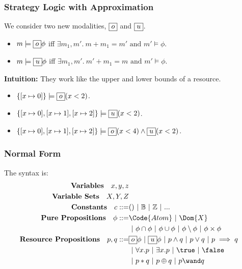 \begin{frame}[fragile]
    \frametitle{Strategy Logic with Approximation}

\begin{definition} We consider two new modalities, $\boxed{o}$ and $\boxed{u}$.
    \begin{itemize}
        \item $m \models\boxed{o}\phi$ iff $\exists m_1, m'.\ m + m_1 = m' \text{ and } m' \models\phi$.
        \item $m \models\boxed{u}\phi$ iff $\exists m_1, m'.\ m' + m_1 = m  \text{ and } m' \models\phi$.
    \end{itemize}
\end{definition}

\textbf{Intuition:} They work like the upper and lower bounds of a resource.

\begin{example}
    \begin{itemize}
        \item $\{[x\mapsto 0]\} \models\boxed{o}(x < 2)$.
        \item $\{[x\mapsto 0], [x\mapsto 1], [x\mapsto 2]\} \models\boxed{u}(x < 2)$.
        \item $\{[x\mapsto 0], [x\mapsto 1], [x\mapsto 2]\} \models\boxed{o}(x < 4) \land \boxed{u}(x < 2)$.
    \end{itemize}
\end{example}

\end{frame}

\begin{frame}[fragile]
    \frametitle{Normal Form}

\begin{definition} The syntax is:
\begin{align*}
    \textbf{Variables} \quad x, y, z  \\
    \textbf{Variable Sets} \quad X, Y, Z \\
    \textbf{Constants} \quad c ::= & () ~|~ \mathbb{B} ~|~ \mathbb{Z} ~|~ ...  \\
    \textbf{Pure Propositions} \quad \phi ::= & \Code{Atom} ~|~ \Dom{X}\\
    & ~|~ \phi \cap \phi ~|~ \phi \cup \phi ~|~ \phi \setminus \phi ~|~ \phi \times \phi \\
    \textbf{Resource Propositions} \quad p,q ::= & \subExt \phi ~|~ \supExt \phi ~|~ p \land q ~|~ p \lor q ~|~ p \implies q \\
    &~|~ \forall x. p ~|~ \exists x. p ~|~ \true ~|~ \false \\
    &~|~ p * q ~|~ p \oplus q ~|~ p \wand q
\end{align*}
\end{definition}

\end{frame}

